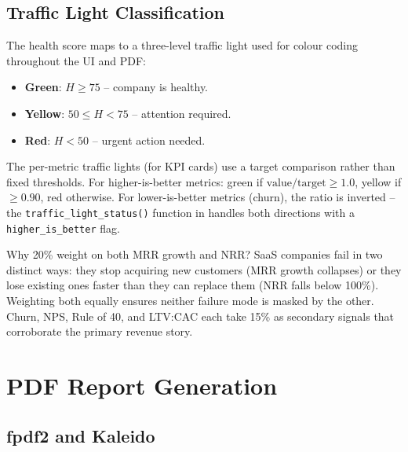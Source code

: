 \subsection{Traffic Light Classification}

The health score maps to a three-level traffic light used for colour coding throughout the UI and PDF:
\begin{itemize}
  \item \textbf{Green}: $H \geq 75$ -- company is healthy.
  \item \textbf{Yellow}: $50 \leq H < 75$ -- attention required.
  \item \textbf{Red}: $H < 50$ -- urgent action needed.
\end{itemize}

The per-metric traffic lights (for KPI cards) use a target comparison rather than fixed thresholds. For higher-is-better metrics: green if $\text{value} / \text{target} \geq 1.0$, yellow if $\geq 0.90$, red otherwise. For lower-is-better metrics (churn), the ratio is inverted -- the \texttt{traffic\_light\_status()} function in  handles both directions with a \texttt{higher\_is\_better} flag.

\begin{decisionbox}
Why 20\% weight on both MRR growth and NRR? SaaS companies fail in two distinct ways: they stop acquiring new customers (MRR growth collapses) or they lose existing ones faster than they can replace them (NRR falls below 100\%). Weighting both equally ensures neither failure mode is masked by the other. Churn, NPS, Rule of 40, and LTV:CAC each take 15\% as secondary signals that corroborate the primary revenue story.
\end{decisionbox}

\section{PDF Report Generation}
\label{sec:kpi-pdf}


\subsection{fpdf2 and Kaleido}

